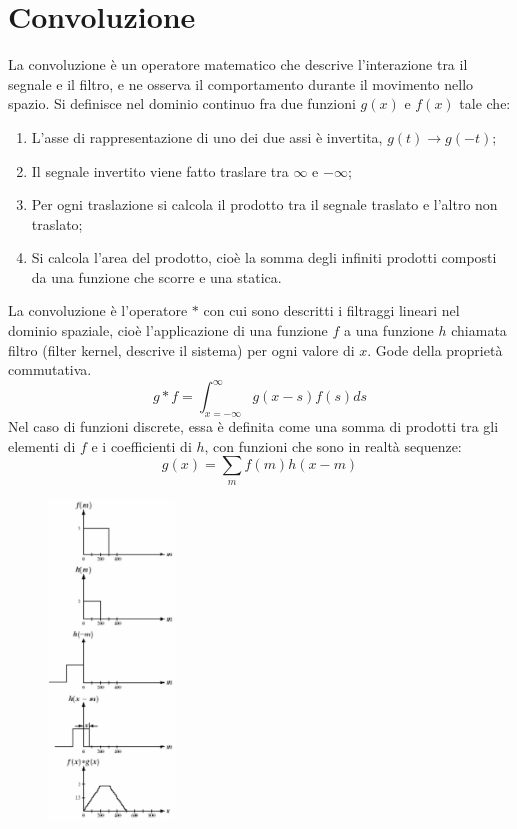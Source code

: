 \section{Convoluzione}
La convoluzione è un operatore matematico che descrive l'interazione tra il segnale e il filtro, e ne osserva il comportamento durante il movimento nello spazio. Si definisce nel dominio continuo fra due funzioni $g(x)$ e $f(x)$ tale che:
\begin{enumerate}
	\item L'asse di rappresentazione di uno dei due assi è invertita, $g(t) \rightarrow g(-t)$;
	\item Il segnale invertito viene fatto traslare tra $\infty$ e $-\infty$;
	\item Per ogni traslazione si calcola il prodotto tra il segnale traslato e l'altro non traslato;
	\item Si calcola l'area del prodotto, cioè la somma degli infiniti prodotti composti da una funzione che scorre e una statica.
\end{enumerate}
La convoluzione è l'operatore $*$ con cui sono descritti i filtraggi lineari nel dominio spaziale, cioè l'applicazione di una funzione $f$ a una funzione $h$ chiamata filtro (filter kernel, descrive il sistema) per ogni valore di $x$. Gode della proprietà commutativa.
$$g * f = \int_{x=-\infty}^{\infty}g(x - s)f(s) ds$$
Nel caso di funzioni discrete, essa è definita come una somma di prodotti tra gli elementi di $f$ e i coefficienti di $h$, con funzioni che sono in realtà sequenze:
$$g(x) = \sum_{m}f(m)h(x - m)$$

\begin{figure}
	\vspace{-15pt}
	\includegraphics[width=0.3\textwidth]{Lezioni/Immagini/convoluzione}
	\vspace{-15pt}
\end{figure}

